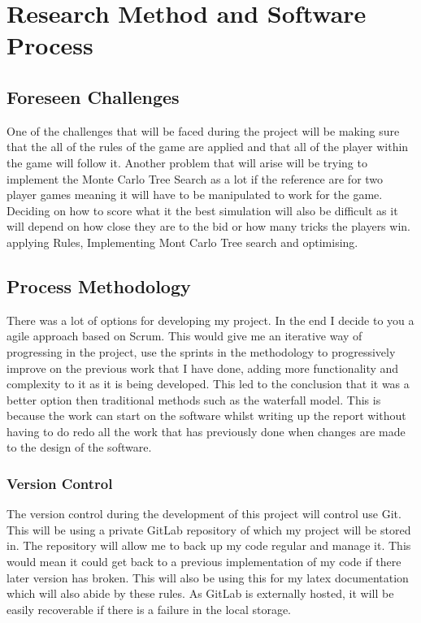 \section{Research Method and Software Process}
\subsection {Foreseen Challenges}
One of the challenges that will be faced during the project will be making sure that the all of the rules of the game are applied and that all of the player within the game will follow it. Another problem that will arise will be trying to implement the Monte Carlo Tree Search as a lot if the reference are for two player games meaning it will have to be manipulated to work for the game. Deciding on how to score what it the best simulation will also be difficult as it will depend on how close they are to the bid or how many tricks the players win.
applying Rules, Implementing Mont Carlo Tree search and optimising.
\subsection {Process Methodology}
There was a lot of options for developing my project. In the end I decide to you a agile approach based on Scrum. This would give me an iterative way of progressing in the project, use the sprints in the methodology to progressively improve on the previous work that I have done, adding more functionality and complexity to it as it is being developed. This led to the conclusion that it was a better option then traditional methods such as the waterfall model. This is because the work can start on the software whilst writing up the report without having to do redo all the work that has previously done when changes are made to the design of the software.
\subsubsection{Version Control}
The version control during the development of this project will control use Git. This will be using a private GitLab repository of which my project will be stored in. The repository will allow me to back up my code regular and manage it. This would mean it could get back to a previous implementation of my code if there later version has broken. This will also be using this for my latex documentation which will also abide by these rules. As GitLab is externally hosted, it will be easily recoverable if there is a failure in the local storage.
